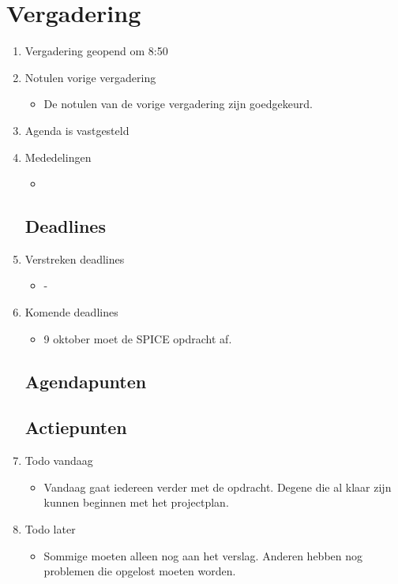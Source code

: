 \documentclass{article}
\begin{document}
\section*{Vergadering}
\begin{enumerate}
	
	\subsection*{Vooraf}
	\item Vergadering geopend om 8:50 %
	\item Notulen vorige vergadering
	\begin{itemize}
		\item De notulen van de vorige vergadering zijn goedgekeurd.
	\end{itemize}
	\item Agenda is vastgesteld
	\item Mededelingen
	\begin{itemize}
		\item
	\end{itemize}

	\subsection*{Deadlines}
	\item Verstreken deadlines
	\begin{itemize}
		\item -
	\end{itemize}
	\item Komende deadlines
	\begin{itemize}
		\item 9 oktober moet de SPICE opdracht af. 
	\end{itemize}

	\subsection*{Agendapunten}
	

	\subsection*{Actiepunten}
	\item Todo vandaag
	\begin{itemize}
		\item Vandaag gaat iedereen verder met de opdracht. Degene die al klaar zijn kunnen beginnen met het projectplan.
	\end{itemize}
	\item Todo later
	\begin{itemize}
		\item Sommige moeten alleen nog aan het verslag. Anderen hebben nog problemen die opgelost moeten worden.
	\end{itemize}


\end{enumerate}
\end{document}
